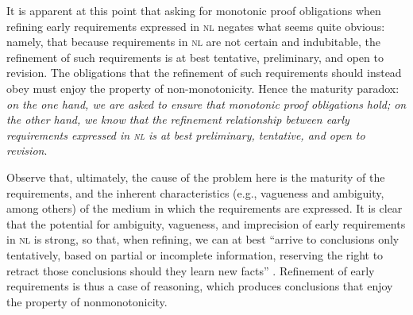 \documentclass[10pt, conference, compsocconf]{IEEEtran}
\begin{document}
It is apparent at this point that asking for monotonic proof obligations when refining early requirements expressed in \textsc{nl} negates what seems quite obvious: namely, that because requirements in \textsc{nl} are not certain and indubitable, the refinement of such requirements is at best tentative, preliminary, and open to revision. The obligations that the refinement of such requirements should instead obey must enjoy the property of non-monotonicity. Hence the maturity paradox: \textit{on the one hand, we are asked to ensure that monotonic proof obligations hold; on the other hand, we know that the refinement relationship between early requirements expressed in \textsc{nl} is at best preliminary, tentative, and open to revision}. 

Observe that, ultimately, the cause of the problem here is the maturity of the requirements, and the inherent characteristics (e.g., vagueness and ambiguity, among others) of the medium in which the requirements are expressed. It is clear that the potential for ambiguity, vagueness, and imprecision of early requirements in \textsc{nl} is strong, so that, when refining, we can at best ``arrive to conclusions only tentatively, based on partial or incomplete information, reserving the right to retract those conclusions should they learn new facts'' \cite{Antonelli:2008:SEP}. Refinement of early requirements is thus a case of reasoning, which produces conclusions that enjoy the property of nonmonotonicity. 


\end{document}
